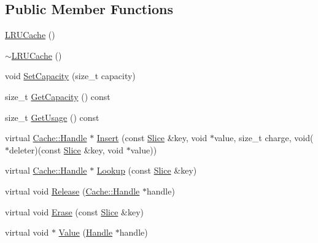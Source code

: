 \subsection*{Public Member Functions}
\begin{DoxyCompactItemize}
\item 
\hyperlink{classleveldb_1_1anonymous__namespace_02cache_8cc_03_1_1_l_r_u_cache_af7cc0d0604dae76b090fe1a3a1705a72}{L\+R\+U\+Cache} ()
\item 
\hyperlink{classleveldb_1_1anonymous__namespace_02cache_8cc_03_1_1_l_r_u_cache_ae4b787808eb2ac259842e52f00d19d6c}{$\sim$\+L\+R\+U\+Cache} ()
\item 
void \hyperlink{classleveldb_1_1anonymous__namespace_02cache_8cc_03_1_1_l_r_u_cache_aa60d64aca9bf5c7a9c0df04f2c74c6c9}{Set\+Capacity} (size\+\_\+t capacity)
\item 
size\+\_\+t \hyperlink{classleveldb_1_1anonymous__namespace_02cache_8cc_03_1_1_l_r_u_cache_ab744d2a5af37fb123f037d5e001750ce}{Get\+Capacity} () const 
\item 
size\+\_\+t \hyperlink{classleveldb_1_1anonymous__namespace_02cache_8cc_03_1_1_l_r_u_cache_a3341c5b14397db50c911fcc1ffc3c6a9}{Get\+Usage} () const 
\item 
virtual \hyperlink{structleveldb_1_1_cache_1_1_handle}{Cache\+::\+Handle} $\ast$ \hyperlink{classleveldb_1_1anonymous__namespace_02cache_8cc_03_1_1_l_r_u_cache_a95dfa4cf361ae2667ed0826d613e647c}{Insert} (const \hyperlink{classleveldb_1_1_slice}{Slice} \&key, void $\ast$value, size\+\_\+t charge, void($\ast$deleter)(const \hyperlink{classleveldb_1_1_slice}{Slice} \&key, void $\ast$value))
\item 
virtual \hyperlink{structleveldb_1_1_cache_1_1_handle}{Cache\+::\+Handle} $\ast$ \hyperlink{classleveldb_1_1anonymous__namespace_02cache_8cc_03_1_1_l_r_u_cache_ac44a690b4446ad4818dbede3e72293da}{Lookup} (const \hyperlink{classleveldb_1_1_slice}{Slice} \&key)
\item 
virtual void \hyperlink{classleveldb_1_1anonymous__namespace_02cache_8cc_03_1_1_l_r_u_cache_a6bd929d2842cce2c014e07441981622f}{Release} (\hyperlink{structleveldb_1_1_cache_1_1_handle}{Cache\+::\+Handle} $\ast$handle)
\item 
virtual void \hyperlink{classleveldb_1_1anonymous__namespace_02cache_8cc_03_1_1_l_r_u_cache_a3557a11d30685b57f0f4f925d9b59999}{Erase} (const \hyperlink{classleveldb_1_1_slice}{Slice} \&key)
\item 
virtual void $\ast$ \hyperlink{classleveldb_1_1anonymous__namespace_02cache_8cc_03_1_1_l_r_u_cache_ad4d34a5b480b34e5614f4600e73dc5b3}{Value} (\hyperlink{structleveldb_1_1_cache_1_1_handle}{Handle} $\ast$handle)

\end{DoxyCompactItemize}
